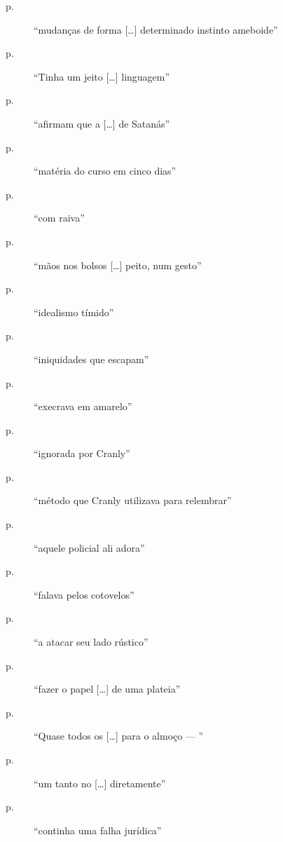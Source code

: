 \begin{description}
\item[p.~\pageref{mudancas"-de}]  ``mudanças de forma [\ldots] determinado instinto ameboide''

\item[p.~\pageref{tinha"-um}]  ``Tinha um jeito [\ldots] linguagem''

\item[p.~\pageref{afirmam"-que}]  ``afirmam que a [\ldots] de Satanás''

\item[p.~\pageref{materia"-do}]  ``matéria do curso em cinco dias''

\item[p.~\pageref{com"-raiva}]  ``com raiva''

\item[p.~\pageref{maos"-nos}]  ``mãos nos bolsos [\ldots] peito, num gesto''

\item[p.~\pageref{idealismo"-timido}]  ``idealismo tímido''

\item[p.~\pageref{iniquidades"-que}]  ``iniquidades que escapam''

\item[p.~\pageref{execrava"-em}]  ``execrava em amarelo''

\item[p.~\pageref{ignorada"-por}]  ``ignorada por Cranly''

\item[p.~\pageref{metodo"-que}]  ``método que Cranly utilizava para relembrar''

\item[p.~\pageref{aquele"-policial}]  ``aquele policial ali adora''

\item[p.~\pageref{falava"-pelos}]  ``falava pelos cotovelos''

\item[p.~\pageref{a"-atacar}]  ``a atacar seu lado rústico''

\item[p.~\pageref{fazer"-o}]  ``fazer o papel [\ldots] de uma plateia''

\item[p.~\pageref{quase"-todos}]  ``Quase todos os [\ldots] para o almoço --- ''

\item[p.~\pageref{um"-tanto}]  ``um tanto no [\ldots] diretamente''

\item[p.~\pageref{continha"-uma}]  ``continha uma falha jurídica''


\end{description}

